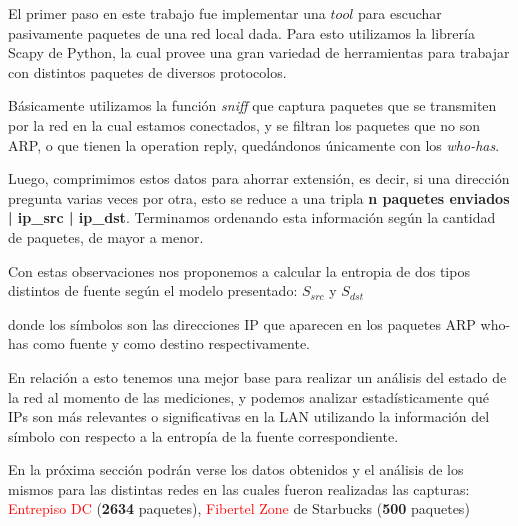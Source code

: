 El primer paso en este trabajo fue implementar una $tool$ para escuchar pasivamente paquetes de una red local dada. 
Para esto utilizamos la librería Scapy de Python, la cual provee una gran variedad
de herramientas para trabajar con distintos paquetes de diversos protocolos.

Básicamente utilizamos la función \emph{sniff} que captura paquetes que se transmiten
por la red en la cual estamos conectados, y se filtran los paquetes que no son ARP, 
o que tienen la operation reply, quedándonos únicamente con los \emph{who-has}.

Luego, comprimimos estos datos para ahorrar extensión, es decir, si una dirección pregunta varias veces por otra,
esto se reduce a una tripla \textbf{n paquetes enviados | ip\_src | ip\_dst}. Terminamos ordenando esta información según la cantidad de paquetes, de mayor a menor.

Con estas observaciones nos proponemos a calcular la entropia de dos tipos
distintos de fuente según el modelo presentado: \textbf{$S_{src}$} y \textbf{$S_{dst}$}


donde los símbolos son las direcciones IP que aparecen en los paquetes ARP who-has
como fuente y como destino respectivamente.

En relación a esto tenemos una mejor base para realizar un análisis del estado de 
la red al momento de las mediciones, y podemos analizar estadísticamente qué IPs 
son más relevantes o significativas en la LAN utilizando la información del símbolo 
con respecto a la entropía de la fuente correspondiente.

En la próxima sección podrán verse los datos obtenidos y el análisis de los mismos
para las distintas redes en las cuales fueron realizadas las capturas: \textcolor{red}{Entrepiso DC} (\textbf{2634} paquetes), \textcolor{red}{Fibertel Zone} de Starbucks (\textbf{500} paquetes)

